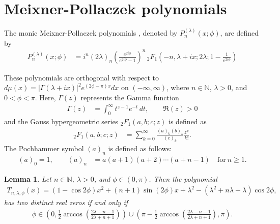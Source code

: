 \documentclass[final,3p,times,12pt]{elsarticle}
\newtheorem{lemma}{Lemma}[section]
\numberwithin{equation}{section}  %
\begin{document}
	
	
	\section{Meixner-Pollaczek polynomials}\label{Meixner-Pollaczek polynomials}
	
	The monic Meixner-Pollaczek polynomials \cite[Section 9.7]{Koekoek-Book-HypergeometricOP}, denoted by $P_n^{(\lambda)}(x; \phi)$, are defined by
	\begin{align}
		P_n^{(\lambda)}(x;\phi) &= i^n (2\lambda)_n \left( \frac{e^{2i\phi}}{e^{2i\phi} - 1} \right)^n \,_2F_1\left( -n, \lambda + i x; 2\lambda; 1 - \frac{1}{e^{2i\phi}} \right)
	\end{align}
	
	These polynomials are orthogonal with respect  to $d\mu(x) = |\Gamma(\lambda + i x)|^2 e^{(2\phi - \pi)x}dx$ on  $(-\infty, \infty)$, where $n \in \mathbb{N}$, $\lambda > 0$, and $0 < \phi < \pi$. Here, $\Gamma(z)$ represents the Gamma function
	\begin{align*}
		\Gamma(z) &= \int_0^\infty t^{z-1} e^{-t} \, dt, \qquad \Re(z)>0
	\end{align*} and  the Gauss hypergeometric series $_2F_1 \left( a, b; c; z \right)$ is defined as
	\begin{align}\label{Gauss Hypergeometric series}
		_2F_1\left( a, b; c; z \right)&= \sum_{k=0}^{\infty} \frac{(a)_k (b)_k}{(c)_k} \frac{z^k}{k!}.
	\end{align}
	The Pochhammer symbol $(a)_n$ is defined as follows:
	\begin{align*}
		(a)_0=1, \qquad (a)_n &= a(a+1)(a+2)\cdots(a+n-1)\quad \text{for}~ n \geq 1.
	\end{align*}
	
	\begin{lemma}
		Let $n \in \mathbb{N}$, $\lambda > 0$, and $\phi \in (0,\pi)$. Then the polynomial
		\begin{align}\label{Quadraticterm-involve-interlacing}
			T_{n,\lambda,\phi}(x)=(1-\cos2\phi)x^2+(n+1)\sin(2\phi) x+ \lambda^2-(\lambda^2+n\lambda+\lambda)\cos2\phi,
		\end{align}
		has two distinct  real zeros if and only if
		\begin{align}\label{condition-phi-positive-discriminant}
			\phi \in \left(0, \frac{1}{2}\arccos\left(\frac{2\lambda-n-1}{2\lambda+n+1}\right)\right)\cup \left(\pi-\frac{1}{2}\arccos\left(\frac{2\lambda-n-1}{2\lambda+n+1}\right), \pi \right).
		\end{align}
	\end{lemma}
	
\end{document}
